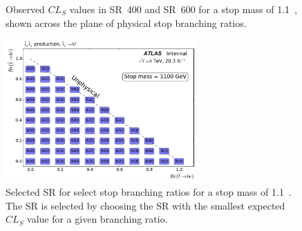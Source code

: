 \begin{figure}[ht]
  \centering
  \caption{
    Observed $CL_S$ values in SR~400 and SR~600 for a stop mass of 1.1~\TeV,
    shown across the plane of physical stop branching ratios.
  }
\end{figure}

\begin{figure}[ht]
  \centering
  \includegraphics[width=0.65\textwidth]
    {figs/blstop/region_selection/region_choice_vs_br_m_1100.pdf}
  \caption{
    Selected SR for select stop branching ratios for a stop mass of 1.1~\TeV.
    The SR is selected by choosing the SR with the smallest expected $CL_S$
    value for a given branching ratio.
  }
\end{figure}

